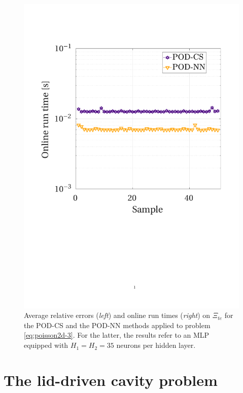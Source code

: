 \documentclass[12pt, a4paper, twoside, openright, notitlepage]{report}
\numberwithin{equation}{chapter}
\theoremstyle{theorem}
\theoremstyle{definition}
\theoremstyle{remark}
\theoremstyle{proposition}
\numberwithin{figure}{chapter}
\begin{document}
\begin{figure}[t!]
			\includegraphics[scale = 0.41, trim = {1.5cm 8.9cm 1.5cm 3.8cm}, clip]{poisson2d_3_cs_time}
			
			\caption{Average relative errors (\emph{left}) and online run times (\emph{right}) on $\Xi_{te}$ for the POD-CS and the POD-NN methods applied to problem \eqref{eq:poisson2d-3}. For the latter, the results refer to an MLP equipped with $H_1 = H_2 = 35$ neurons per hidden layer.}
			\label{fig:poisson2d-3-fig4}
		\end{figure}
		
	\vspace*{0.3cm}
		
	\section{The lid-driven cavity problem}
	\label{section:The lid-driven cavity problem}
	
\end{document}
